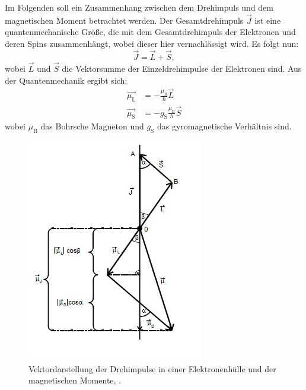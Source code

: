 Im Folgenden soll ein Zusammenhang zwischen dem Drehimpuls und dem magnetischen Moment betrachtet werden. 
Der Gesamtdrehimpuls $\vec{J}$ ist eine quantenmechanische Größe, die mit dem Gesamtdrehimpuls der Elektronen und deren Spins zusammenhängt, wobei dieser hier vernachlässigt wird. 
Es folgt nun:
\begin{equation*}
\vec{J} = \vec{L} + \vec{S},
\end{equation*}
wobei $\vec{L}$ und $\vec{S}$ die Vektorsumme der Einzeldrehimpulse der Elektronen sind. Aus der Quantenmechanik ergibt sich:
\begin{align*}
\vec{\mu_\text{L}} &= -\frac{\mu_\text{B}}{\hbar}\vec{L} \\
\vec{\mu_\text{S}} &= -g_\text{S}\frac{\mu_\text{B}}{\hbar}\vec{S} 
\end{align*}
wobei $\mu_\text{B}$ das Bohrsche Magneton und $g_\text{S}$ das gyromagnetische Verhältnis sind. 
\begin{figure}[h!]
	\centering
	\includegraphics[width=0.6\linewidth]{Vektordarstellung.jpg}
	\caption{Vektordarstellung der Drehimpulse in einer Elektronenhülle und der magnetischen Momente, \cite[3]{anleitung606}.}
	\label{fig:vektordarstellung}
\end{figure}


